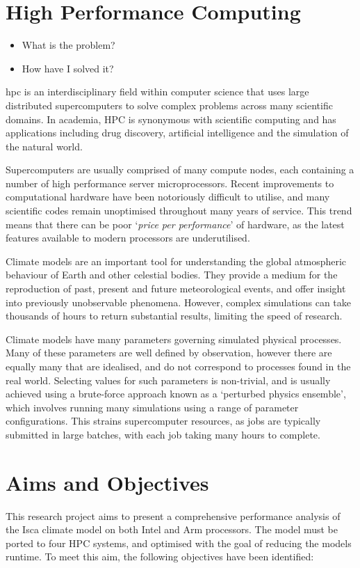 \documentclass[a4paper,11pt]{report}
\begin{document}
\section{High Performance Computing}
\label{sec:sec01}
\begin{itemize}
	\item What is the problem?
	\item How have I solved it?
\end{itemize}
\gls{hpc} is an interdisciplinary field within computer science that uses large distributed supercomputers to solve complex problems across many scientific domains. In academia, HPC is synonymous with scientific computing and has applications including drug discovery, artificial intelligence and the simulation of the natural world. 
\par
Supercomputers are usually comprised of many compute nodes, each containing a number of high performance server microprocessors. Recent improvements to computational hardware have been notoriously difficult to utilise, and many scientific codes remain unoptimised throughout many years of service. This trend means that there can be poor `\textit{price per performance}' of hardware, as the latest features available to modern processors are underutilised. 
\par
Climate models are an important tool for understanding the global atmospheric behaviour of Earth and other celestial bodies. They provide a medium for the reproduction of past, present and future meteorological events, and offer insight into previously unobservable phenomena. However, complex simulations can take thousands of hours to return substantial results, limiting the speed of research.
\par
Climate models have many parameters governing simulated physical processes. Many of these parameters are well defined by observation, however there are equally many that are idealised, and do not correspond to processes found in the real world. Selecting values for such parameters is non-trivial, and is usually achieved using a brute-force approach known as a ‘perturbed physics ensemble’, which involves running many simulations using a range of parameter configurations. This strains supercomputer resources, as jobs are typically submitted in large batches, with each job taking many hours to complete.

\section{Aims and Objectives}
This research project aims to present a comprehensive performance analysis of the Isca climate model on both Intel and Arm processors. The model must be ported to four HPC systems, and optimised with the goal of reducing the models runtime. To meet this aim, the following objectives have been identified:
\end{document}
